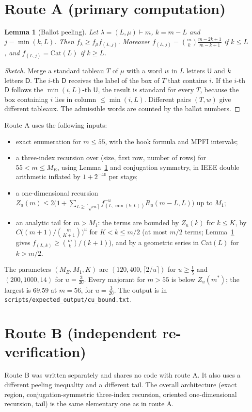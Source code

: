 \documentclass[11pt]{amsart}
\newtheorem{lemma}[theorem]{Lemma}
\theoremstyle{remark}
\newcommand{\Cat}{\mathrm{Cat}}
\begin{document}
\section{Route A (primary computation)}
\begin{lemma}[Ballot peeling]\label{lem:A}
Let $\lambda=(L,\mu)\vdash m$, $k=m-L$ and $j=\min(k,L)$. Then $f_\lambda\ge f_\mu f_{(L,j)}$. Moreover
$f_{(L,j)}=\binom mk\frac{m-2k+1}{m-k+1}$ if $k\le L$, and $f_{(L,j)}=\Cat(L)$ if $k\ge L$.
\end{lemma}
\begin{proof}[Sketch]
Merge a standard tableau $T$ of $\mu$ with a word $w$ in $L$ letters $\mathsf U$ and $k$ letters $\mathsf D$. The
$i$-th $\mathsf D$ receives the label of the box of $T$ that contains $i$. If the $i$-th $\mathsf D$ follows the
$\min(i,L)$-th $\mathsf U$, the result is standard for every $T$, because the box containing $i$ lies in column
$\le\min(i,L)$. Different pairs $(T,w)$ give different tableaux. The admissible words are counted by the
ballot numbers.
\end{proof}
Route A uses the following inputs:
\begin{itemize}
\item exact enumeration for $m\le55$, with the hook formula and MPFI intervals;
\item a three-index recursion over (size, first row, number of rows) for $55<m\le M_E$, using Lemma~\ref{lem:A}
and conjugation symmetry, in IEEE double arithmetic inflated by $1+2^{-40}$ per stage;
\item a one-dimensional recursion
$Z_u(m)\le2\bigl(1+\sum_{L\ge\lceil\sqrt m\rceil}f_{(L,\min(k,L))}^{-u}R_u(m-L,L)\bigr)$ up to $M_1$;
\item an analytic tail for $m>M_1$: the terms are bounded by $Z_u(k)$ for $k\le K$, by
$C\bigl((m+1)/\binom m{K+1}\bigr)^u$ for $K<k\le m/2$ (at most $m/2$ terms; Lemma~\ref{lem:A} gives $f_{(L,k)}\ge\binom mk/(k+1)$), and by a geometric series in $\Cat(L)$ for $k>m/2$.
\end{itemize}
The parameters $(M_E,M_1,K)$ are $(120,400,\lceil2/u\rceil)$ for $u\ge\frac15$ and $(200,1000,14)$ for
$u=\frac3{20}$. Every majorant for $m>55$ is below $Z_u(m^*)$; the largest is $69.59$ at $m=56$, for
$u=\frac3{20}$. The output is in \texttt{scripts/expected\_output/cu\_bound.txt}.

\section{Route B (independent re-verification)}\label{sec:B}
Route B was written separately and shares no code with route A. It also uses a different peeling inequality
and a different tail. The overall architecture (exact region, conjugation-symmetric three-index recursion,
oriented one-dimensional recursion, tail) is the same elementary one as in route A.
\end{document}
